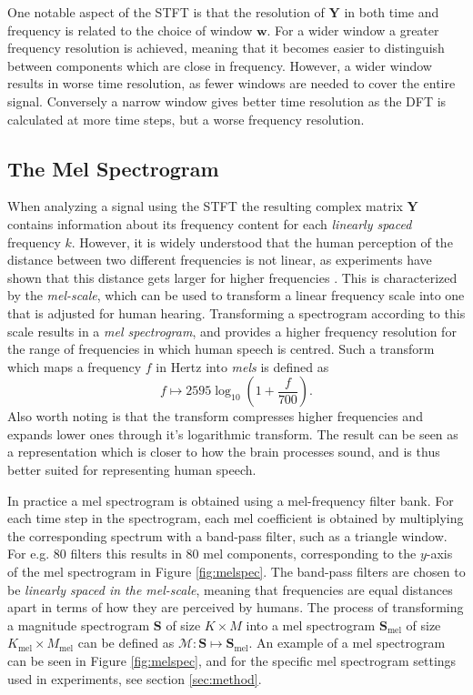 \documentclass{report}
\begin{document}
One notable aspect of the STFT is that the resolution of $\bm{Y}$ in both time and frequency is related to the choice of window $\bm{w}$. For a wider window a greater frequency resolution is achieved, meaning that it becomes easier to distinguish between components which are close in frequency. However, a wider window results in worse time resolution, as fewer windows are needed to cover the entire signal. Conversely a narrow window gives better time resolution as the DFT is calculated at more time steps, but a worse frequency resolution.

\subsection{The Mel Spectrogram} \label{sec:melspec}
When analyzing a signal using the STFT the resulting complex matrix $\bm{Y}$ contains information about its frequency content for each \textit{linearly spaced} frequency $k$. However, it is widely understood that the human perception of the distance between two different frequencies is not linear, as experiments have shown that this distance gets larger for higher frequencies \cite{stevens1937scale}. This is characterized by the \textit{mel-scale}, which can be used to transform a linear frequency scale into one that is adjusted for human hearing. Transforming a spectrogram according to this scale results in a \textit{mel spectrogram}, and provides a higher frequency resolution for the range of frequencies in which human speech is centred. Such a transform which maps a frequency $f$ in Hertz into \textit{mels} is defined as
\begin{equation}
    f \longmapsto 2595 \log_{10} \left( 1 + \frac{f}{700} \right).
\end{equation}
Also worth noting is that the transform compresses higher frequencies and expands lower ones through it's logarithmic transform. The result can be seen as a representation which is closer to how the brain processes sound, and is thus better suited for representing human speech.

In practice a mel spectrogram is obtained using a mel-frequency filter bank. For each time step in the spectrogram, each mel coefficient is obtained by multiplying the corresponding spectrum with a band-pass filter, such as a triangle window. For e.g. 80 filters this results in 80 mel components, corresponding to the $y$-axis of the mel spectrogram in Figure \ref{fig:melspec}. The band-pass filters are chosen to be \textit{linearly spaced in the mel-scale}, meaning that frequencies are equal distances apart in terms of how they are perceived by humans. The process of transforming a magnitude spectrogram $\bm{S}$ of size $K \times M$ into a mel spectrogram $\bm{S}_{\text{mel}}$ of size $K_{\text{mel}} \times M_{\text{mel}}$ can be defined as $\mathcal{M}: \bm{S} \mapsto \bm{S}_{\text{mel}}$. An example of a mel spectrogram can be seen in Figure \ref{fig:melspec}, and for the specific mel spectrogram settings used in experiments, see section \ref{sec:method}.
\end{document}
